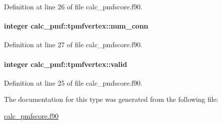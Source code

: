 Definition at line 26 of file calc\-\_\-pmfscore.\-f90.

\hypertarget{structcalc__pmf_1_1tpmfvertex_ac6c6b56a203e6b52b5dac7fc8c7a12c5}{
\paragraph[{num\-\_\-conn}]{\setlength{\rightskip}{0pt plus 5cm}integer calc\-\_\-pmf\-::tpmfvertex\-::num\-\_\-conn}}\label{structcalc__pmf_1_1tpmfvertex_ac6c6b56a203e6b52b5dac7fc8c7a12c5}


Definition at line 27 of file calc\-\_\-pmfscore.\-f90.

\hypertarget{structcalc__pmf_1_1tpmfvertex_a34decf425f3564694916986b3992d064}{
\paragraph[{valid}]{\setlength{\rightskip}{0pt plus 5cm}integer calc\-\_\-pmf\-::tpmfvertex\-::valid}}\label{structcalc__pmf_1_1tpmfvertex_a34decf425f3564694916986b3992d064}


Definition at line 25 of file calc\-\_\-pmfscore.\-f90.



The documentation for this type was generated from the following file\-:\begin{DoxyCompactItemize}
\item 
\hyperlink{calc__pmfscore_8f90}{calc\-\_\-pmfscore.\-f90}\end{DoxyCompactItemize}
